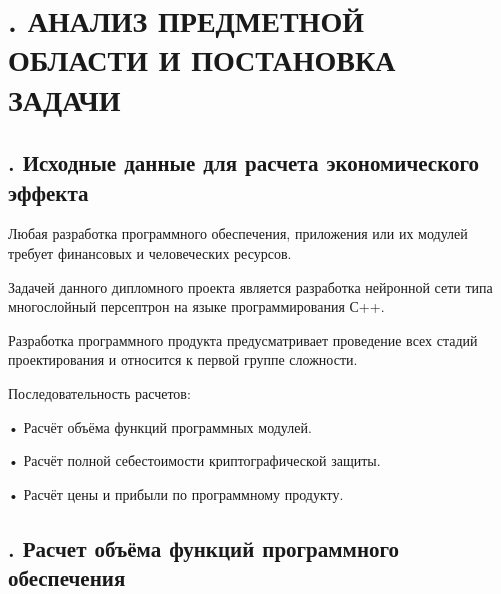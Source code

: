 \setcounter{chaptercntr}{6}

\sectionbreak \section*{
	\gostTitleFont
	\redline
	\thechaptercntr .
	АНАЛИЗ ПРЕДМЕТНОЙ ОБЛАСТИ И ПОСТАНОВКА ЗАДАЧИ
}

\titlespace

\subsection*{ 
	\gostTitleFont
	\redline
	\thechaptercntr .\thesubchaptercntr \spc
	Исходные данные для расчета экономического эффекта
} \addtocounter{subchaptercntr}{1}

\subtitlespace

{\gostFont
	
	
	\par \redline Любая разработка программного обеспечения, приложения или их модулей требует финансовых и человеческих ресурсов.
	
	\par \redline Задачей данного дипломного проекта является разработка нейронной сети типа многослойный персептрон на языке программирования С++.
	
	\par \redline Разработка программного продукта предусматривает проведение всех стадий проектирования и относится к первой группе сложности. 
	
	\par \redline Последовательность расчетов:
	
	\par \redline •  Расчёт объёма функций программных модулей.
	
	\par \redline •  Расчёт полной себестоимости криптографической защиты.
	
	\par \redline •  Расчёт цены и прибыли по программному продукту.
	
}

\subtitlespace

\subsection*{ 
	\gostTitleFont
	\redline
	\thechaptercntr .\thesubchaptercntr \spc
	Расчет объёма функций программного обеспечения
} \addtocounter{subchaptercntr}{1}

